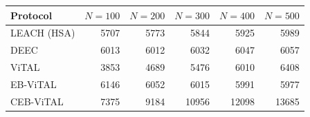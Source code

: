 \begin{tabular}{lrrrrr}
\hline
Protocol & $N=100$ & $N=200$ & $N=300$ & $N=400$ & $N=500$ \\
\hline
LEACH (HSA) & 5707 & 5773 & 5844 & 5925 & 5989 \\
DEEC & 6013 & 6012 & 6032 & 6047 & 6057 \\
ViTAL & 3853 & 4689 & 5476 & 6010 & 6408 \\
EB-ViTAL & 6146 & 6052 & 6015 & 5991 & 5977 \\
CEB-ViTAL & 7375 & 9184 & 10956 & 12098 & 13685 \\
\hline
\end{tabular}

